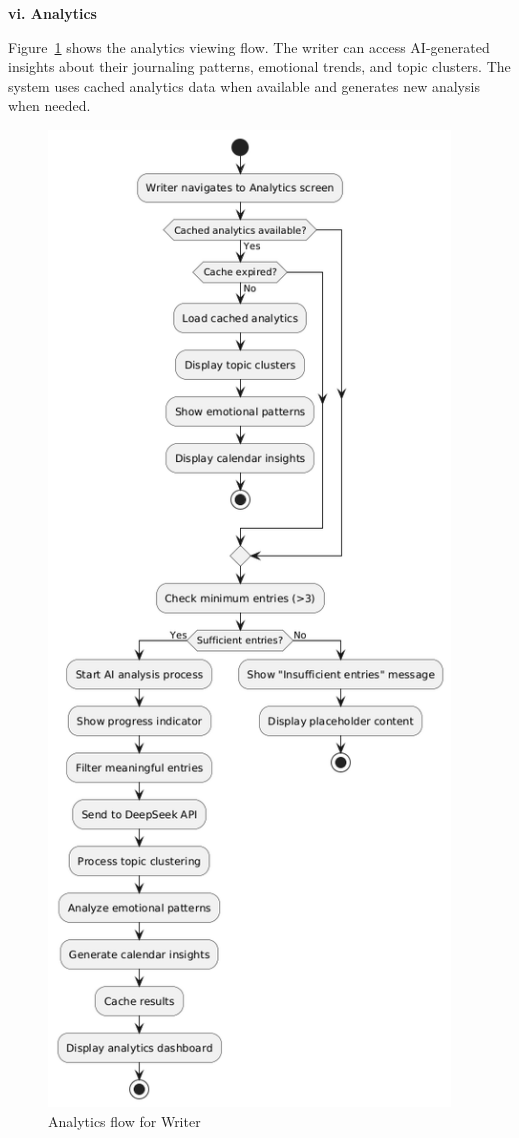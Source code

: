 \textbf{vi. Analytics}

Figure~\ref{fig:analytics-flow} shows the analytics viewing flow. The writer can access AI-generated insights about their journaling patterns, emotional trends, and topic clusters. The system uses cached analytics data when available and generates new analysis when needed.

\begin{figure}[H]
\centering
\includegraphics[width=0.95\textwidth,height=0.7\textheight,keepaspectratio]{files/imgs/analytics_flow.png}
\caption{Analytics flow for Writer}
\label{fig:analytics-flow}
\end{figure}
\clearpage

